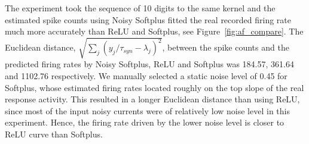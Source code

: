 \documentclass{article}
\begin{document}
	The experiment took the sequence of 10 digits to the same kernel and the estimated spike counts using Noisy Softplus fitted the real recorded firing rate much more accurately than ReLU and Softplus, see Figure~\ref{fig:af_compare}.
	The Euclidean distance, $\sqrt{\sum_{j}(y_j/\tau_{syn} - \lambda_j)^2}$, between the spike counts and the predicted firing rates by Noisy Softplus, ReLU and Softplus was 184.57, 361.64 and 1102.76 respectively.
	We manually selected a static noise level of 0.45 for Softplus, whose estimated firing rates located roughly on the top slope of the real response activity.
	This resulted in a longer Euclidean distance than using ReLU, since most of the input noisy currents were of relatively low noise level in this experiment.
	Hence, the firing rate driven by the lower noise level is closer to ReLU curve than Softplus.
	
\end{document}
